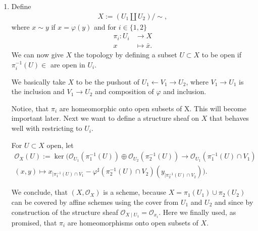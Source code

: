 \newcommand{\sheet}{5}




\maketitle{}

\begin{exercise}{1}


    \begin{enumerate}
        \item{Define 
            \begin{align*}
                X:= (U_1 \coprod U_2)/\!{\sim},
            \end{align*}
            where $x\sim y$ if $x=\varphi(y)$ and for $i\in \lbrace
            1,2\rbrace$
            \begin{align*}
                \pi_i \colon U_i &\to X\\
                x& \mapsto \bar{x}.
            \end{align*}
            We can now give $X$ the topology by defining a subset $U\subset X$ to be
            open if $\pi^{-1}_i(U)\in$ are open in $U_i$.

            We basically take $X$ to be the pushout of $U_1 \leftarrow V_1
            \rightarrow U_2$, where $V_1 \rightarrow U_1$ is the inclusion and
            $V_1 \rightarrow U_2$ and composition of $\varphi$ and inclusion.

            Notice, that $\pi_i$ are homeomorphic onto open subsets of X. This
            will become important later. Next we want to define a structure
            sheaf on $X$ that behaves well with restricting to $U_i.$

            For $U\subset X$ open, let 
            \begin{align*}
                \mathcal{O}_X(U):= \ker (\mathcal{O}_{U_1}(\pi^{-1}_1(U))\oplus
                \mathcal{O}_{U_2}(\pi^{-1}_2(U)) \to
                \mathcal{O}_{U_1}(\pi^{-1}_1(U)
                \cap V_1)\\ (x,y) \mapsto x_{\mid \pi^{-1}_1(U)\cap
                V_1}-\varphi^\sharp (\pi_2^{-1}(U)\cap V_2)(y_{\mid
                \pi_2^{-1}(U)\cap V_2}) ).
            \end{align*}

            We conclude, that $(X,\mathcal{O}_X)$ is a scheme, because
            $X=\pi_1(U_1)\cup \pi _2(U_2)$  can be covered by affine schemes
            using the cover from $U_1$ and $U_2$ and since by construction of
            the structure sheaf $\mathcal{O}_{X \mid U_1}=\mathcal{O}_{x_i}.$
            Here we finally used, as promised, that $\pi_i$ are homeomorphisms
            onto open subsets of $X$.}
    \end{enumerate}
\end{exercise}




